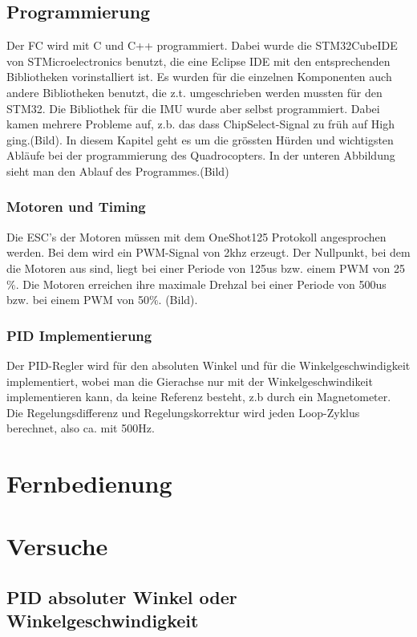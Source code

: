 \documentclass[12pt,a4paper, ngerman]{article}
\begin{document}
\subsection{Programmierung}
Der FC wird mit C und C++ programmiert. Dabei wurde die STM32CubeIDE von STMicroelectronics benutzt, die eine Eclipse IDE mit den entsprechenden Bibliotheken vorinstalliert ist. Es wurden für die einzelnen Komponenten auch andere Bibliotheken benutzt, die z.t. umgeschrieben werden mussten für den STM32. Die Bibliothek für die IMU wurde aber selbst programmiert. Dabei kamen mehrere Probleme auf, z.b. das dass ChipSelect-Signal zu früh auf High ging.(Bild). In diesem Kapitel geht es um die grössten Hürden und wichtigsten Abläufe bei der programmierung des Quadrocopters. In der unteren Abbildung sieht man den Ablauf des Programmes.(Bild)

\subsubsection{Motoren und Timing}
Die ESC's der Motoren müssen mit dem OneShot125 Protokoll\cite{website:OL_OneShot125} angesprochen werden. Bei dem wird ein PWM-Signal von 2khz erzeugt. Der Nullpunkt, bei dem die Motoren aus sind, liegt bei einer Periode von 125us bzw. einem PWM von 25$\%$. Die Motoren erreichen ihre maximale Drehzal bei einer Periode von 500us bzw. bei einem PWM von 50$\%$. (Bild).
\subsubsection{PID Implementierung}
Der PID-Regler wird für den absoluten Winkel und für die Winkelgeschwindigkeit implementiert, wobei man die Gierachse nur mit der Winkelgeschwindikeit implementieren kann, da keine Referenz besteht, z.b durch ein Magnetometer. Die Regelungsdifferenz und Regelungskorrektur wird jeden Loop-Zyklus berechnet, also ca. mit 500Hz.  

\section{Fernbedienung}

\section{Versuche}

\subsection{PID absoluter Winkel oder Winkelgeschwindigkeit}
\end{document}
